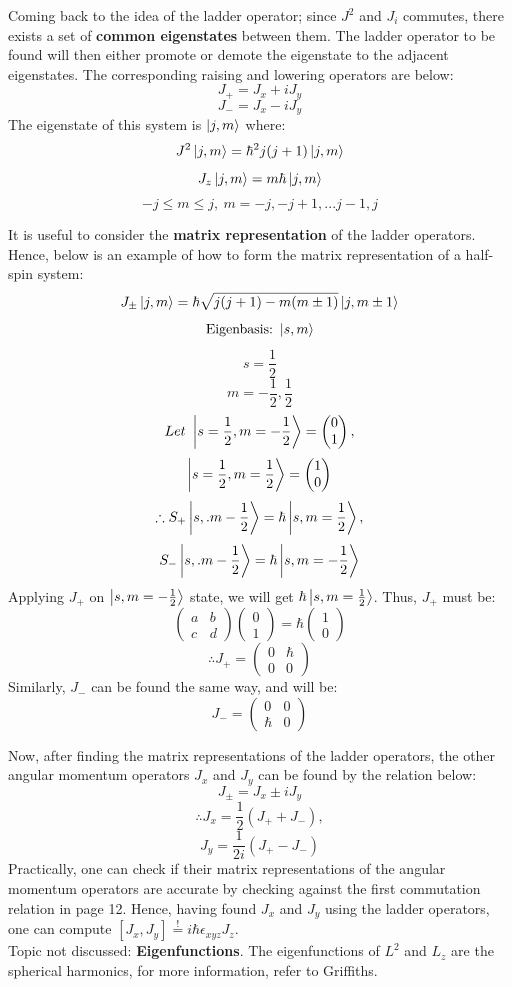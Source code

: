 \documentclass{article}
\begin{document}
\begin{flushleft}
Coming back to the idea of the ladder operator; since $J^2$ and $J_i$ commutes, there exists a set of \textbf{common eigenstates} between them. The ladder operator to be found will then either promote or demote the eigenstate to the adjacent eigenstates. The corresponding raising and lowering operators are below:
$$J_+=J_x+iJ_y$$
$$J_-=J_x-iJ_y$$
The eigenstate of this system is $\ket{j,m}$ where:
$$J^2\ket{j,m}=\hbar^2j(j+1)\ket{j,m}$$
$$J_z\ket{j,m}=m\hbar\ket{j,m}$$
$$-j\le m\le j,\ m=-j,-j+1,...j-1,j$$

It is useful to consider the \textbf{matrix representation} of the ladder operators. Hence, below is an example of how to form the matrix representation of a half-spin system:
$$J_\pm\ket{j,m}=\hbar\sqrt{j(j+1)-m(m\pm1)}\ket{j,m\pm1}$$
$$\text{Eigenbasis:}\ \ket{s,m}$$
$$s=\frac{1}{2}$$
$$m=-\frac{1}{2},\frac{1}{2}$$
$$Let\ \ket{s=\frac{1}{2},m=-\frac{1}{2}}=\begin{pmatrix}
    0\\1
    \end{pmatrix},$$
$$\ket{s=\frac{1}{2},m=\frac{1}{2}}=\begin{pmatrix}
    1\\0
    \end{pmatrix}$$
$$\therefore S_+\ket{s,.m-\frac{1}{2}}=\hbar\ket{s,m=\frac{1}{2}},$$
$$S_-\ket{s,.m-\frac{1}{2}}=\hbar\ket{s,m=-\frac{1}{2}}$$
Applying $J_+$ on $\ket{s,m=-\frac{1}{2}}$ state, we will get $\hbar\ket{s,m=\frac{1}{2}}$.
Thus, $J_+$ must be:
$$
\begin{pmatrix}
    a&b\\
    c&d
\end{pmatrix}\begin{pmatrix}
    0\\1
\end{pmatrix}
=\hbar
\begin{pmatrix}
  1\\0  
\end{pmatrix}$$
$$\therefore J_+=
\begin{pmatrix}
    0&\hbar\\
    0&0
\end{pmatrix}$$
Similarly, $J_-$ can be found the same way, and will be:
$$J_-=\begin{pmatrix}
    0&0\\
    \hbar&0
\end{pmatrix}$$

Now, after finding the matrix representations of the ladder operators, the other angular momentum operators $J_x$ and $J_y$ can be found by the relation below:
$$J_\pm=J_x\pm iJ_y$$
$$\therefore J_x=\frac{1}{2}(J_++J_-),$$
$$J_y=\frac{1}{2i}(J_+-J_-)$$
Practically, one can check if their matrix representations of the angular momentum operators are accurate by checking against the first commutation relation in page 12. Hence, having found $J_x$ and $J_y$ using the ladder operators, one can compute $[J_x,J_y]\overset{!}{=} i\hbar\epsilon_{xyz}J_z$.\\[0.5cm]
Topic not discussed: \textbf{Eigenfunctions}. The eigenfunctions of $L^2$ and $L_z$ are the spherical harmonics, for more information, refer to Griffiths.
\pagebreak


\end{flushleft}
\end{document}
